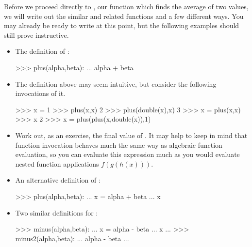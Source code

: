 Before we proceed directly to , our function which finds the average of two values, we will write out the similar and related functions  and  a few different ways.
You may already be ready to write  at this point, but the following examples should still prove instructive.
\begin{itemize}
    \item The definition of :
\begin{codeblock}
>>>  plus(alpha,beta):
...      alpha + beta
\end{codeblock}
    \item The definition above may seem intuitive, but consider the following invocations of it.
\begin{codeblock}
>>> x = 1
>>> plus(x,x)
2
>>> plus(double(x),x)
3
>>> x = plus(x,x)
>>> x
2
>>> x = plus(plus(x,double(x)),1)
\end{codeblock}
    \item Work out, as an exercise, the final value of .
        It may help to keep in mind that function invocation behaves much the same way as algebraic function evaluation, so you can evaluate this expression much as you would evaluate nested function applications $f(g(h(x)))$.
    \item An alternative definition of :
\begin{codeblock}
>>>  plus(alpha,beta):
...     x = alpha + beta
...      x
\end{codeblock}
    \item Two similar definitions for :
\begin{codeblock}
>>>  minus(alpha,beta):
...     x = alpha - beta
...      x
...
>>>  minus2(alpha,beta):
...      alpha - beta
...
\end{codeblock}
\end{itemize}

